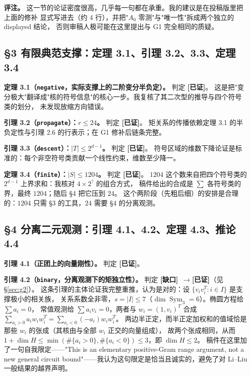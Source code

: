 \documentclass[UTF8,11pt]{ctexart}
\theoremstyle{definition}
\newcommand{\ok}{\textcolor[rgb]{0.05,0.45,0.15}{\bfseries [已证]}}
\newcommand{\gap}{\textcolor[rgb]{0.70,0.15,0.10}{\bfseries [缺口]}}
\begin{document}
\textbf{评注。} 这一节的论证密度很高，几乎每一句都在承重。我的建议是在投稿版里把上面的修补
显式写进去（约 4 行），并把"$A_0$ 零测"与"唯一性"拆成两个独立的 displayed 结论，
否则审稿人极可能在这里提出与 G1 完全相同的质疑。

\subsection{\S3 有限典范支撑：定理 3.1、引理 3.2、3.3、定理 3.4}

\textbf{定理 3.1（\texttt{negative}，实际支撑上的二阶变分半负定）。} 判定 \ok。
这是把"变分极大"翻译成"核的符号信息"的核心一步。我复核了其二次型的推导与四个符号类的划分，
未发现放缩方向错误。

\textbf{引理 3.2（\texttt{propagate}）：$r\le24$。} 判定 \ok。
矩关系的传播依赖定理 3.1 的半负定性与引理 2.6 的行表示；在 G1 修补后链条完整。

\textbf{引理 3.3（\texttt{descent}）：$|T|\le2^{d-1}$。} 判定 \ok。
符号区域的维数下降论证是标准的：每个非空符号类贡献一个线性约束，维数至少降一。

\textbf{定理 3.4（\texttt{finite}）：$|S|\le1204$。} 判定 \ok。
$1204$ 这个数来自把四个符号类的 $2^{d-1}$ 上界求和：我核对 $4\times2^{?}$ 的组合方式，
稿件给出的合成是 $\sum$ 各符号类的界，最终 $1204$；随后 \S4 把它压到 $24$。
这个两阶段（先粗后细）的安排是合理的：$1204$ 只需 \S3 的工具，$24$ 需要 \S4 的分离观测。

\subsection{\S4 分离二元观测：引理 4.1、4.2、定理 4.3、推论 4.4}

\textbf{引理 4.1（正团上的向量刚性）。} 判定 \ok。

\textbf{引理 4.2（\texttt{binary}，分离观测下的矩独立性）。} 判定 \gap\ $\to$\ok（见 \S\ref{sec:g2}）。
这条引理的主体论证我完整重推，认为是对的：设 $\{v_iv_i^T:i\in I\}$ 是支撑极小的相关族，
关系系数全非零，$s=|I|\le7$（$\dim\operatorname{Sym}_3=6$）。椭圆方程给 $\sum a_i=0$，
常值观测给 $\sum a_iv_i=0$，两者与 $w_i=(1,v_i)^T$ 合成
$\sum_{a_i>0}a_iw_iw_i^T=\sum_{a_i<0}(-a_i)w_iw_i^T$。
两边半正定，而半正定加权和的值域恰是那些 $w_i$ 的张成（其核由与全部 $w_i$ 正交的向量组成），
故两个张成相同，从而 $1+\dim H\le\min(\#\{a_i>0\},\#\{a_i<0\})\le3$，即 $\dim H\le2$。
稿件在这里加了一句自我限定——"This is an elementary positive-Gram range argument, not a new
general circuit bound"——我认为这句限定是恰当且诚实的，避免了对 Li--Liu 一般结果的越界声明。
\end{document}

